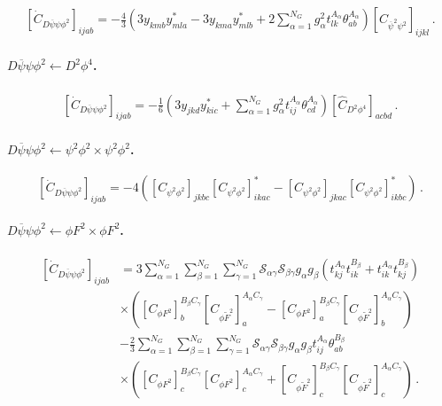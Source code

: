 \begin{align}
    \left[\dot C_{D\overline \psi \psi \phi^2}\right]_{ijab} =
    -\frac{4}{3}\left(
    3y_{kmb}y^*_{mla}-3y_{kma}y^*_{mlb}
    + 2 \sum_{\alpha=1}^{N_G}g_\alpha^2 t^{A_\alpha}_{lk}\theta^{A_\alpha}_{ab}
    \right)\left[C_{\overline\psi^2\psi^2}\right]_{ijkl}
    \,.
\end{align}

\paragraph{$D\overline \psi \psi \phi^2 \leftarrow D^2\phi^4$.}

\begin{align}
    \left[\dot C_{D\overline \psi \psi \phi^2}\right]_{ijab} =
    -\frac{1}{6}
    \left(
    3 y_{jkd}y^*_{kic} +\sum_{\alpha=1}^{N_G} g_\alpha^2 t^{A_\alpha}_{ij}\theta^{A_\alpha}_{cd}
    \right)
    \left[\widehat C_{D^2\phi^4}\right]_{acbd}
    \,.
\end{align}

\paragraph{$D\overline \psi \psi \phi^2 \leftarrow \psi^2\phi^2 \times \psi^2\phi^2$.}

\begin{equation}
     \left[\dot C_{D\overline \psi \psi \phi^2}\right]_{ijab} =
     -4 \left(
     \left[C_{\psi^2\phi^2}\right]_{jkbc} \left[C_{\psi^2\phi^2}\right]_{ikac}^* -  \left[C_{\psi^2\phi^2}\right]_{jkac} \left[C_{\psi^2\phi^2}\right]_{ikbc}^* \right) \,.
\end{equation}

\paragraph{$D\overline \psi \psi \phi^2 \leftarrow \phi F^2 \times \phi F^2$.}

\begin{align}
    \left[\dot C_{D\overline \psi \psi \phi^2}\right]_{ijab} &= 3 \sum_{\alpha=1}^{N_G} \sum_{\beta=1}^{N_G} \sum_{\gamma=1}^{N_G} \mathcal S_{\alpha\gamma} \mathcal S_{\beta\gamma} g_\alpha g_\beta 
    \left(t^{A_\alpha}_{kj} t^{B_\beta}_{ik} + t^{A_\alpha}_{ik} t^{B_\beta}_{kj} \right)
    \nonumber \\
    &\times
    \left(\left[C_{\phi F^2}\right]_b^{B_\beta C_\gamma} \left[C_{\phi \widetilde F^2}\right]_a^{A_\alpha C_\gamma} - \left[C_{\phi F^2}\right]_a^{B_\beta C_\gamma} \left[C_{\phi \widetilde F^2}\right]_b^{A_\alpha C_\gamma} \right) \nonumber \\
    & - \frac{2}{3} \sum_{\alpha=1}^{N_G} \sum_{\beta=1}^{N_G} \sum_{\gamma=1}^{N_G} \mathcal S_{\alpha\gamma} \mathcal S_{\beta\gamma} g_\alpha g_\beta t^{A_\alpha}_{ij}\theta^{B_\beta}_{ab}
    \nonumber \\
    &\times
    \left(\left[C_{\phi F^2}\right]_c^{B_\beta C_\gamma} \left[C_{\phi F^2}\right]_c^{A_\alpha C_\gamma} + \left[C_{\phi \widetilde F^2}\right]_c^{B_\beta C_\gamma} \left[C_{\phi \widetilde F^2}\right]_c^{A_\alpha C_\gamma} \right)\,.
\end{align}


